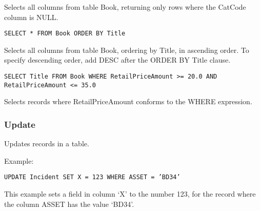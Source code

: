 Selects all columns from table Book, returning only rows where the CatCode column
is NULL.

\tt{SELECT * FROM Book ORDER BY Title}

Selects all columns from table Book, ordering by Title, in ascending order. To specify
descending order, add DESC after the ORDER BY Title clause.

\tt{SELECT Title FROM Book WHERE RetailPriceAmount >= 20.0 AND RetailPriceAmount <= 35.0}

Selects records where RetailPriceAmount conforms to the WHERE expression.

\subsubsection{Update}

Updates records in a table.

Example:

\tt{UPDATE Incident SET X = 123 WHERE ASSET = 'BD34'}

This example sets a field in column `X' to the number 123, for the record
where the column ASSET has the value `BD34'.



